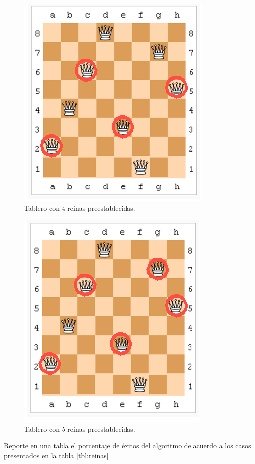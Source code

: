 \documentclass[runningheads,a4paper]{llncs}
\begin{document}
\begin{figure}[!ht]
\centering
\includegraphics[scale=0.8]{reinas4.png}
\caption{Tablero con 4 reinas preestablecidas.}
\end{figure}

\begin{figure}[!ht]
\centering
\includegraphics[scale=0.8]{reinas5.png}
\caption{Tablero con 5 reinas preestablecidas.}
\end{figure}

Reporte en una tabla  el porcentaje de \'exitos del algoritmo de acuerdo a los  casos presentados en la tabla \ref{tbl:reinas}
\end{document}
